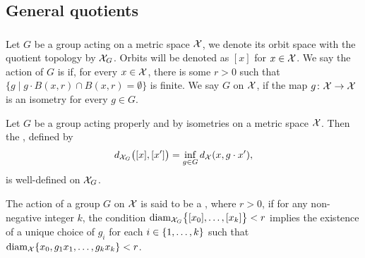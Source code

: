 
\subsection{General quotients}

\subsubsection{}


Let $G$ be a group acting on a metric space $\cX$, we denote its orbit space with the quotient topology by $\cX_G$.
Orbits will be denoted as $[x]$ for $x \in \cX$.
We say the action of $G$ is  if, for every $x \in \cX$, there is some $r>0$ such that $\{g \mid g\cdot B(x,r) \cap B(x,r) = \emptyset\}$ is finite.
We say $G$  on $\cX$, if the map $g \colon \cX \to \cX$ is an isometry for every $g \in G$.

Let $G$ be a group acting properly and by isometries on a metric space $\cX$.
Then the , defined by
\[
d_{\cX_G}\big([x], [x']\big) = \inf_{g \in G} d_\cX(x, g \cdot x'),
\]
is well-defined on $\cX_G$.

The action of a group $G$ on $\cX$ is said to be a  , where $r > 0$, if for any non-negative integer $k$, the condition $\diam_{\cX_G}\set[\big]{[x_0],\dots,[x_k]} < r$ implies the existence of a unique choice of $g_i$ for each $i \in \set{1,\dots,k}$ such that $\diam_{\cX}\set{x_0, g_1x_1, \dots, g_kx_k} < r$.

\subsubsection{}\label{subsub:h}

